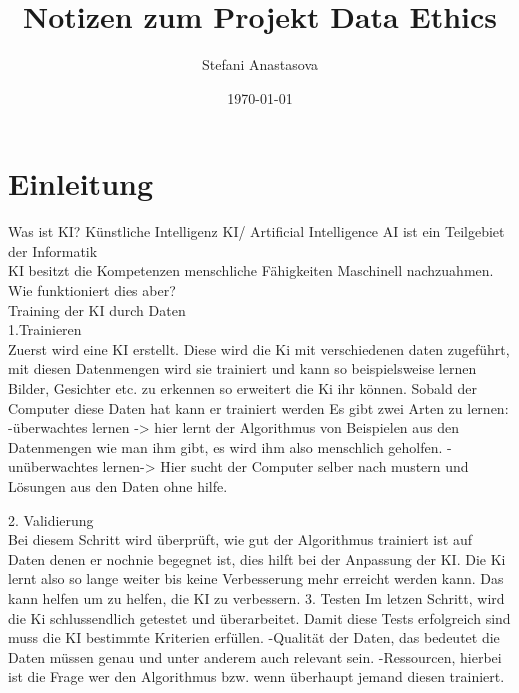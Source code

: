 \documentclass{article}
\title{Notizen zum Projekt Data Ethics}
\author{Stefani Anastasova}
\date{\today}
\begin{document}
\maketitle




\tableofcontents

\section{Einleitung}
Was ist KI?
Künstliche Intelligenz KI/ Artificial Intelligence AI ist ein Teilgebiet der Informatik \\
KI besitzt die Kompetenzen menschliche Fähigkeiten Maschinell nachzuahmen.
Wie funktioniert dies aber? \\
    Training der KI durch Daten\\ 
    1.Trainieren\\
Zuerst wird eine KI erstellt. Diese wird die Ki mit verschiedenen daten zugeführt, mit diesen Datenmengen wird sie trainiert und kann so beispielsweise lernen Bilder, Gesichter etc. zu erkennen
    so erweitert die Ki ihr können. Sobald der Computer diese Daten hat kann er trainiert werden 
    Es gibt zwei Arten zu lernen:  
    -überwachtes lernen -> hier lernt der Algorithmus von Beispielen aus den Datenmengen wie man ihm gibt, es wird ihm also menschlich geholfen.
    -unüberwachtes lernen-> Hier sucht der Computer selber nach mustern und Lösungen aus den Daten ohne hilfe.

    2. Validierung\\
    Bei diesem Schritt wird überprüft, wie gut der Algorithmus trainiert ist auf Daten denen er nochnie begegnet ist, dies hilft bei der Anpassung der KI. 
    Die Ki lernt also so lange weiter bis keine Verbesserung mehr erreicht werden kann. 
    Das kann helfen um zu helfen, die KI zu verbessern.
    3. Testen
    Im letzen Schritt, wird die Ki schlussendlich getestet und überarbeitet. Damit diese Tests erfolgreich sind muss die KI bestimmte Kriterien erfüllen.
    -Qualität der Daten, das bedeutet die Daten müssen genau und unter anderem auch relevant sein.
    -Ressourcen, hierbei ist die Frage wer den Algorithmus bzw. wenn überhaupt jemand diesen trainiert. 
\\
\\
\end{document}
